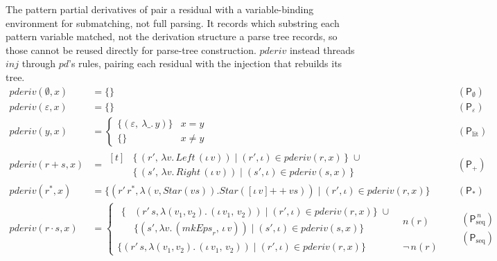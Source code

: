 The pattern partial derivatives of \citet[Fig.~11]{sulzmannlu2012}
pair a residual with a variable-binding environment for submatching, not full parsing.
It records which substring each pattern variable matched,
not the derivation structure a parse tree records,
so those cannot be reused directly for parse-tree construction.
$\mathit{pderiv}$ instead threads $\mathit{inj}$ through $pd$'s rules,
pairing each residual with the injection that rebuilds its tree.
\begin{equation}\label{eq:pderiv-tree}
\begin{aligned}
\mathit{pderiv}(\emptyset, x) &= \{\} &&(\mathsf{P}_{\emptyset}) \\
\mathit{pderiv}(\varepsilon, x) &= \{\} &&(\mathsf{P}_{\varepsilon}) \\
\mathit{pderiv}(y, x) &=
  \begin{cases}
    \{(\varepsilon,\ \lambda\_.\, y)\} & x = y \\
    \{\} & x \neq y
  \end{cases}
  &&(\mathsf{P}_{\mathrm{lit}}) \\
\mathit{pderiv}(r + s, x) &=
  \begin{aligned}[t]
    &\{\,(r',\, \lambda v.\, \mathit{Left}\,(\iota\,v))
      \mid (r', \iota) \in \mathit{pderiv}(r, x)\,\} \;\cup \\
    &\{\,(s',\, \lambda v.\, \mathit{Right}\,(\iota\,v))
      \mid (s', \iota) \in \mathit{pderiv}(s, x)\,\}
  \end{aligned}
  &&(\mathsf{P}_{+}) \\
\mathit{pderiv}(r^{*}, x) &=
  \{(r'\,r^{*},
     \lambda(v, \mathit{Star}(vs)).
     \mathit{Star}([\iota\,v] \mathbin{+\!\!+} vs))
    \mid (r', \iota) \in \mathit{pderiv}(r, x)\}
  &&(\mathsf{P}_{*}) \\
\mathit{pderiv}(r \cdot s, x) &=
  \begin{cases}
    \begin{aligned}
    \{&(r'\,s,\lambda(v_1, v_2).\, (\iota\,v_1,\, v_2))
      \mid (r', \iota) \in \mathit{pderiv}(r, x)\} \;\cup \\
    &\{(s',\lambda v.\, (\mathit{mkEps}_{r},\, \iota\,v))
      \mid (s', \iota) \in \mathit{pderiv}(s, x)\}
    \end{aligned}
      & n(r) \\
    \{(r'\,s,\lambda(v_1, v_2).\, (\iota\,v_1,\, v_2))
      \mid (r', \iota) \in \mathit{pderiv}(r, x)\}
      & \neg\, n(r)
  \end{cases}
  &&\begin{array}{l} (\mathsf{P}_{\mathrm{seq}}^{\,n}) \\[1.2em] (\mathsf{P}_{\mathrm{seq}}) \end{array}
\end{aligned}
\end{equation}

